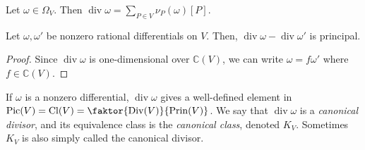 \begin{definition}
    Let \( \omega \in \Omega_V \).
    Then \( \operatorname{div} \omega = \sum_{P \in V} \nu_P(\omega) [P] \).
\end{definition}
\begin{proposition}
    Let \( \omega, \omega' \) be nonzero rational differentials on \( V \).
    Then, \( \operatorname{div}\omega - \operatorname{div}\omega' \) is principal.
\end{proposition}
\begin{proof}
    Since \( \operatorname{div}\omega \) is one-dimensional over \( \mathbb C(V) \), we can write \( \omega = f \omega' \) where \( f \in \mathbb C(V) \).
\end{proof}
If \( \omega \) is a nonzero differential, \( \operatorname{div} \omega \) gives a well-defined element in \( \mathrm{Pic}(V) = \mathrm{Cl}(V) = \faktor{\mathrm{Div}(V)}{\mathrm{Prin}(V)} \).
We say that \( \operatorname{div}\omega \) is a \emph{canonical divisor}, and its equivalence class is the \emph{canonical class}, denoted \( K_V \).
Sometimes \( K_V \) is also simply called the canonical divisor.

